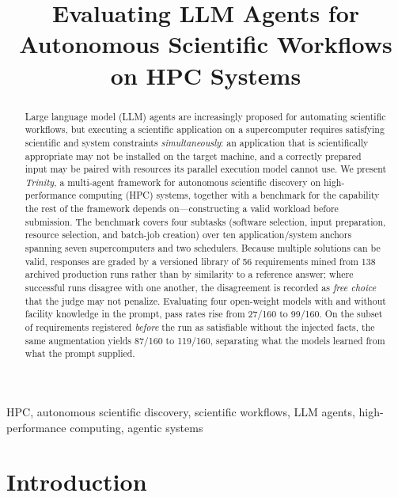 \documentclass[conference]{IEEEtran}
\title{Evaluating LLM Agents for Autonomous Scientific Workflows on HPC Systems}
\begin{document}
\maketitle



\begin{abstract}
Large language model (LLM) agents are increasingly proposed for automating scientific workflows, but executing a scientific application on a supercomputer requires satisfying scientific and system constraints \emph{simultaneously}: an application that is scientifically appropriate may not be installed on the target machine, and a correctly prepared input may be paired with resources its parallel execution model cannot use. We present \textit{Trinity}, a multi-agent framework for autonomous scientific discovery on high-performance computing (HPC) systems, together with a benchmark for the capability the rest of the framework depends on---constructing a valid workload before submission. The benchmark covers four subtasks (software selection, input preparation, resource selection, and batch-job creation) over ten application/system anchors spanning seven supercomputers and two schedulers. Because multiple solutions can be valid, responses are graded by a versioned library of 56 requirements mined from 138 archived production runs rather than by similarity to a reference answer; where successful runs disagree with one another, the disagreement is recorded as \emph{free choice} that the judge may not penalize. Evaluating four open-weight models with and without facility knowledge in the prompt, pass rates rise from 27/160 to 99/160. On the subset of requirements registered \emph{before} the run as satisfiable without the injected facts, the same augmentation yields 87/160 to 119/160, separating what the models learned from what the prompt supplied.
\end{abstract}

\begin{IEEEkeywords}
HPC, autonomous scientific discovery, scientific workflows,
LLM agents, high-performance computing, agentic systems
\end{IEEEkeywords}

\section{Introduction}\label{sec:introduction}
\end{document}
